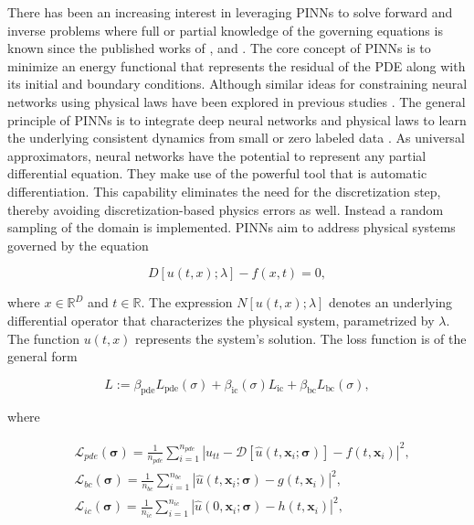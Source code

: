 \documentclass[11pt,twoside]{article}
\begin{document}
There has been an increasing interest in leveraging PINNs to solve forward and 
inverse problems where full or partial knowledge of the governing equations is known since the published 
works of ,  and 
. The core concept of PINNs is to minimize an energy functional that represents 
the residual of the PDE along with its initial and boundary conditions. Although similar ideas for constraining 
neural networks using physical laws have been explored in previous studies \citep{lagaris_artificial_1998}. 
The general principle of PINNs is to integrate deep neural networks and physical 
laws to learn the underlying consistent dynamics from small or zero labeled data \citep{karniadakis_physics-informed_2021}. 
As universal approximators, neural networks have the potential to represent any partial differential 
equation. They make use of the powerful tool that is automatic differentiation. This capability eliminates 
the need for the discretization step, thereby avoiding discretization-based physics errors as well. 
Instead a random sampling of the domain is implemented. PINNs aim to address 
physical systems governed by the equation

$$
D[u(t, x); \lambda] - f(x,t) = 0,
$$

where \(x \in \mathbb{R}^D\) and \(t \in \mathbb{R}\). The expression \(N[u(t, x); \lambda]\) denotes 
an underlying differential operator that characterizes the physical system, parametrized by \(\lambda\). 
The function \(u(t, x)\) represents the system's solution. The loss function is of the general form 

$$ L := \beta_{\text{pde}}L_{\text{pde}}(\sigma) + \beta_{\text{ic}}(\sigma) L_{\text{ic}} + 
\beta_{\text{bc}} L_{\text{bc}}(\sigma) ,$$

where

$$
\begin{aligned}
& \mathcal{L}_{pde}(\boldsymbol{\sigma})=\frac{1}{n_{pde}} \sum_{i=1}^{n_{pde}}\left|u_{tt} - 
\mathcal{D}\left[\hat{u}\left(t,\boldsymbol{x}_i ; \boldsymbol{\sigma}\right)\right]-f\left(t, \boldsymbol{x}_i\right)\right|^2, \\
& \mathcal{L}_{bc}(\boldsymbol{\sigma})=\frac{1}{n_{bc}} \sum_{i=1}^{n_{bc}}\left|\hat{u}\left(t, \boldsymbol{x}_i ;
 \boldsymbol{\sigma}\right)-g\left(t, \boldsymbol{x}_i\right)\right|^2, \\
& \mathcal{L}_{ic}(\boldsymbol{\sigma})=\frac{1}{n_{ic}} \sum_{i=1}^{n_{ic}}\left|\hat{u}\left(0, \boldsymbol{x}_i ;
 \boldsymbol{\sigma}\right)-h\left(t,\boldsymbol{x}_i\right)\right|^2,
\end{aligned}
$$
\end{document}
